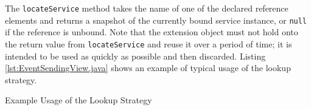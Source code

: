 \documentclass[12pt]{article}
\begin{document}
The \texttt{locateService} method takes the name of one of the declared reference elements and returns a snapshot of the currently bound service instance, or \texttt{null} if the reference is unbound. Note that the extension object must not hold onto the return value from \texttt{locateService} and reuse it over a period of time; it is intended to be used as quickly as possible and then discarded. Listing \ref{lst:EventSendingView.java} shows an example of typical usage of the lookup strategy.

\begin{program}

\caption{Example Usage of the Lookup Strategy}
\label{lst:EventSendingView.java}
\end{program}
\end{document}

